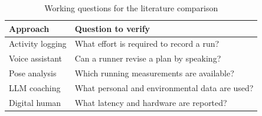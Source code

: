 \begin{table}[t]
\caption{Working questions for the literature comparison}
\label{tab:comparison}
\centering
\footnotesize
\begin{tabular}{@{}p{}p{}@{}}
\toprule
Approach & Question to verify \\
\midrule
Activity logging & What effort is required to record a run? \\
Voice assistant & Can a runner revise a plan by speaking? \\
Pose analysis & Which running measurements are available? \\
LLM coaching & What personal and environmental data are used? \\
Digital human & What latency and hardware are reported? \\
\bottomrule
\end{tabular}
\end{table}
